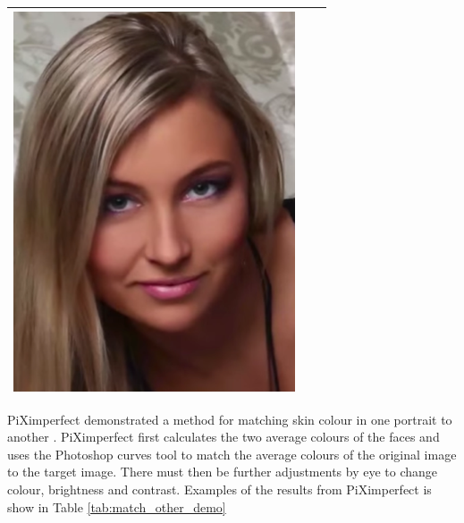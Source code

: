 \begin{table}[H]
\begin{tabular}{|c|c|c|}
\begin{minipage}{.29\textwidth}
    \includegraphics[width=\textwidth,height=\textheight,keepaspectratio]{images/match_body_res}
  \end{minipage} \\
    \hline
\end{tabular}
\end{table}

PiXimperfect demonstrated a method for matching skin colour in one portrait to another \cite{photoshop:match_other}. PiXimperfect first calculates the two average colours of the faces and uses the Photoshop curves tool to match the average colours of the original image to the target image. There must then be further adjustments by eye to change colour, brightness and contrast. Examples of the results from PiXimperfect is show in Table \ref{tab:match_other_demo}

